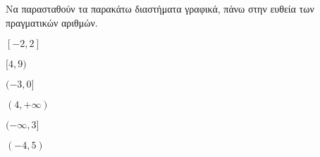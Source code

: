 Να παρασταθούν τα παρακάτω διαστήματα γραφικά, πάνω στην ευθεία των πραγματικών αριθμών.
\begin{multicols}{3}
\begin{alist}[leftmargin=5mm]
\item $ [-2,2] $
\item $ [4,9) $
\item $ (-3,0] $
\item $ (4,+\infty) $
\item $ (-\infty,3] $
\item $ (-4,5) $
\end{alist}
\end{multicols}
